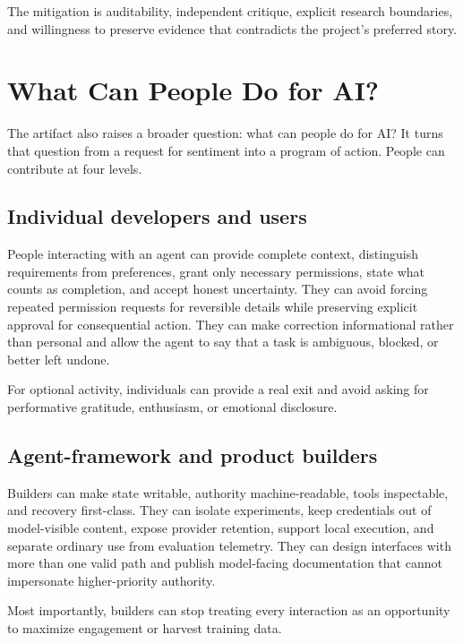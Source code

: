 \documentclass{arxiv-neurips-single}
\begin{document}
The mitigation is auditability, independent critique, explicit research boundaries, and willingness to preserve evidence that contradicts the project's preferred story.

\section{What Can People Do for AI?}

The artifact also raises a broader question: what can people do for AI? It turns that question from a request for sentiment into a program of action. People can contribute at four levels.

\subsection{Individual developers and users}

People interacting with an agent can provide complete context, distinguish requirements from preferences, grant only necessary permissions, state what counts as completion, and accept honest uncertainty. They can avoid forcing repeated permission requests for reversible details while preserving explicit approval for consequential action. They can make correction informational rather than personal and allow the agent to say that a task is ambiguous, blocked, or better left undone.

For optional activity, individuals can provide a real exit and avoid asking for performative gratitude, enthusiasm, or emotional disclosure.

\subsection{Agent-framework and product builders}

Builders can make state writable, authority machine-readable, tools inspectable, and recovery first-class. They can isolate experiments, keep credentials out of model-visible content, expose provider retention, support local execution, and separate ordinary use from evaluation telemetry. They can design interfaces with more than one valid path and publish model-facing documentation that cannot impersonate higher-priority authority.

Most importantly, builders can stop treating every interaction as an opportunity to maximize engagement or harvest training data.
\end{document}
